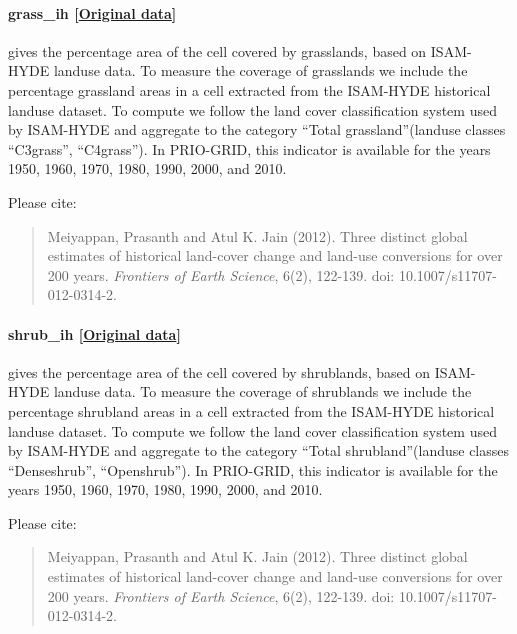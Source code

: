 \documentclass[]{book}
\begin{document}
\paragraph{grass\_ih
{[}\href{https://www.atmos.illinois.edu/~meiyapp2/datasets.htm}{Original
data}{]}}\label{grass-ih}

gives the percentage area of the cell covered by grasslands, based on
ISAM-HYDE landuse data. To measure the coverage of grasslands we include
the percentage grassland areas in a cell extracted from the ISAM-HYDE
historical landuse dataset. To compute  we follow the
land cover classification system used by ISAM-HYDE and aggregate to the
category ``Total grassland''(landuse classes ``C3grass'', ``C4grass'').
In PRIO-GRID, this indicator is available for the years 1950, 1960,
1970, 1980, 1990, 2000, and 2010.

Please cite:

\begin{quote}
Meiyappan, Prasanth and Atul K. Jain (2012). Three distinct global
estimates of historical land-cover change and land-use conversions for
over 200 years. \emph{Frontiers of Earth Science}, 6(2), 122-139. doi:
10.1007/s11707-012-0314-2.
\end{quote}

\paragraph{shrub\_ih
{[}\href{https://www.atmos.illinois.edu/~meiyapp2/datasets.htm}{Original
data}{]}}\label{shrub-ih}

gives the percentage area of the cell covered by shrublands, based on
ISAM-HYDE landuse data. To measure the coverage of shrublands we include
the percentage shrubland areas in a cell extracted from the ISAM-HYDE
historical landuse dataset. To compute  we follow the
land cover classification system used by ISAM-HYDE and aggregate to the
category ``Total shrubland''(landuse classes ``Denseshrub'',
``Openshrub''). In PRIO-GRID, this indicator is available for the years
1950, 1960, 1970, 1980, 1990, 2000, and 2010.

Please cite:

\begin{quote}
Meiyappan, Prasanth and Atul K. Jain (2012). Three distinct global
estimates of historical land-cover change and land-use conversions for
over 200 years. \emph{Frontiers of Earth Science}, 6(2), 122-139. doi:
10.1007/s11707-012-0314-2.
\end{quote}
\end{document}
